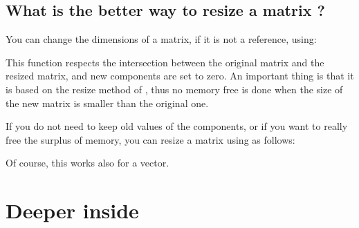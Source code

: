 \documentclass[a4paper,11pt,english]{sphinxmanual}
\begin{document}
\section{What is the better way to resize a matrix ?}
\label{\detokenize{gmm/first-step:what-is-the-better-way-to-resize-a-matrix}}
\sphinxAtStartPar
You can change the dimensions of a matrix, if it is not a reference, using:

\begin{sphinxVerbatim}[commandchars=\\\{\}]
  
\end{sphinxVerbatim}

\sphinxAtStartPar
This function respects the intersection between the original matrix and the resized matrix, and new components are set to zero. An important thing is that it is based on the resize method of , thus no memory free is done when the size of the new matrix is smaller than the original one.

\sphinxAtStartPar
If you do not need to keep old values of the components, or if you want to really free the surplus of memory, you can resize a matrix using  as follows:

\begin{sphinxVerbatim}[commandchars=\\\{\}]
  

  

       
\end{sphinxVerbatim}

\sphinxAtStartPar
Of course, this works also for a vector.


\chapter{Deeper inside }
\label{\detokenize{gmm/inside:deeper-inside-gmm}}\label{\detokenize{gmm/inside:gmm-inside}}\label{\detokenize{gmm/inside::doc}}
\end{document}
